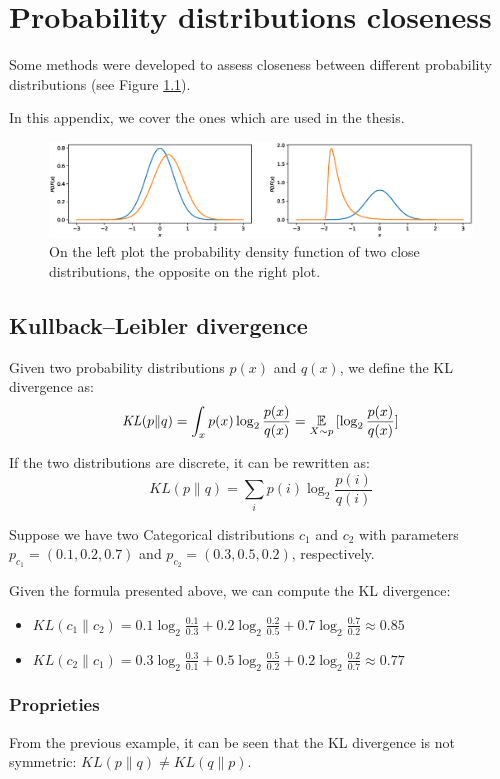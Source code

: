 \chapter{Probability distributions closeness}
Some methods were developed to assess closeness between different probability distributions (see Figure \ref{fig:diffkl}).

In this appendix, we cover the ones which are used in the thesis.

\begin{figure}[H]
    \centering
    \includegraphics[width=\textwidth]{images/diff-kl.eps}
    \caption{On the left plot the probability density function of two close distributions, the opposite on the right plot.}
    \label{fig:diffkl}
\end{figure}

\section{Kullback–Leibler divergence}
Given two probability distributions $p(x)$ and $q(x)$, we define the KL divergence as:
$$ \mathit{KL}(p \| q) = \int_x p(x) \log_2 \frac{p(x)}{q(x)} = \operatorname*{\mathbb{E}}_{X \sim p}{[\log_2 \frac{p(x)}{q(x)}]}$$

If the two distributions are discrete, it can be rewritten as:
$$ \mathit{KL}(p \| q) = \sum_i p(i) \log_2 \frac{p(i)}{q(i)}$$

Suppose we have two Categorical distributions $c_1$ and $c_2$ with parameters $p_{c_1} = (0.1, 0.2, 0.7)$ and $p_{c_2} = (0.3, 0.5, 0.2)$, respectively.

Given the formula presented above, we can compute the KL divergence:
\begin{itemize}
    \item $\mathit{KL}(c_1 \| c_2) = 0.1 \log_2 \frac{0.1}{0.3} + 0.2 \log_2 \frac{0.2}{0.5} + 0.7 \log_2 \frac{0.7}{0.2} \approx 0.85$
    \item $\mathit{KL}(c_2 \| c_1) = 0.3 \log_2 \frac{0.3}{0.1} + 0.5 \log_2 \frac{0.5}{0.2} + 0.2 \log_2 \frac{0.2}{0.7} \approx 0.77$
\end{itemize}


\subsection{Proprieties}
From the previous example, it can be seen that the KL divergence is not symmetric: $\mathit{KL}(p \| q) \neq \mathit{KL}(q \| p)$.


